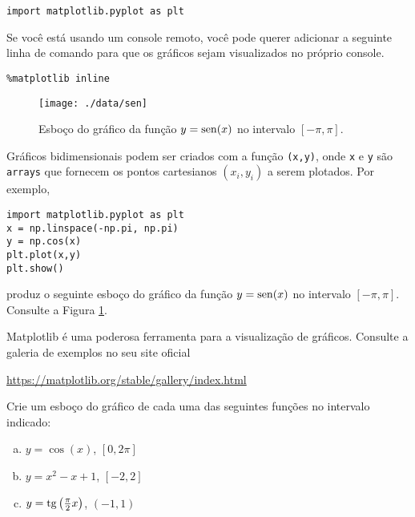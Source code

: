 \documentclass[12pt]{article}
\begin{document}
\begin{lstlisting}
import matplotlib.pyplot as plt
\end{lstlisting}

\begin{obs}
  Se você está usando um console {\python} remoto, você pode querer adicionar a seguinte linha de comando para que os gráficos sejam visualizados no próprio console.

\begin{lstlisting}
%matplotlib inline
\end{lstlisting}

\end{obs}

\begin{figure}[h]
  \centering
  \texttt{[image: ./data/sen]}
  \caption{Esboço do gráfico da função $y=\operatorname{sen}(x)$ no intervalo $[-\pi,\pi]$.}
  \label{fig:sen}
\end{figure}

Gráficos bidimensionais podem ser criados com a função {\PYTHONmatplotlibDOTpyplotDOTplot}\texttt{(x,y)}, onde \lstinline+x+ e \lstinline+y+ são \texttt{arrays} que fornecem os pontos cartesianos $(x_i, y_i)$ a serem plotados. Por exemplo,

\begin{lstlisting}
import matplotlib.pyplot as plt
x = np.linspace(-np.pi, np.pi)
y = np.cos(x)
plt.plot(x,y)
plt.show()
\end{lstlisting}

produz o seguinte esboço do gráfico da função $y=\operatorname{sen}(x)$ no intervalo $[-\pi,\pi]$. Consulte a Figura \ref{fig:sen}.


\begin{obs}
  Matplotlib é uma poderosa ferramenta para a visualização de gráficos. Consulte a galeria de exemplos no seu site oficial
  \begin{center}
    \url{https://matplotlib.org/stable/gallery/index.html}
  \end{center}
\end{obs}

\begin{exr}
  Crie um esboço do gráfico de cada uma das seguintes funções no intervalo indicado:
  \begin{enumerate}[a)]
  \item $y = \cos(x)$, $\left[0, 2\pi\right]$
  \item $y = x^2 - x + 1$, $[-2, 2]$
  \item $y = \operatorname{tg}\left(\frac{\pi}{2}x\right)$, $(-1, 1)$
  \end{enumerate}
\end{exr}
\end{document}
